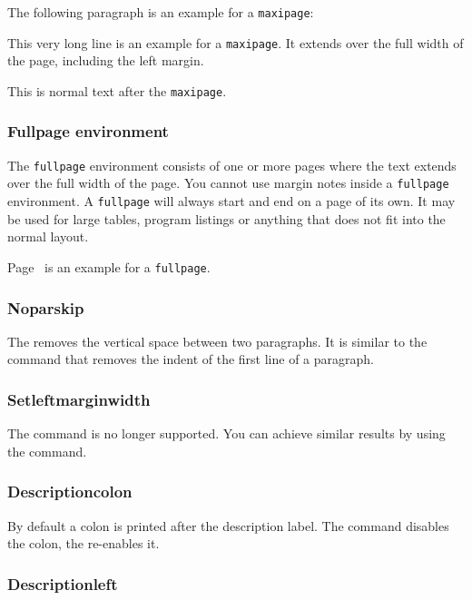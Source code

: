 The following paragraph is an example for a \texttt{maxipage}:
\nopagebreak
\begin{maxipage}
This very long line is an example for a \texttt{maxipage}. It extends 
over the full width of the page, including the left margin.
\end{maxipage}\nopagebreak
This is normal text after the \texttt{maxipage}.

\subsubsection{Fullpage environment} \label{fullpage}

The \texttt{fullpage} environment consists of one or more pages where 
the text extends over the full width of the page. You cannot use 
margin notes inside a \texttt{fullpage} environment. A \texttt{fullpage} 
will always start and end on a page of its own. It may be used for 
large tables, program listings or anything that does not fit into the 
normal layout.

Page~\pageref{bild} is an example for a \texttt{fullpage}.

\subsubsection{Noparskip}

The  removes the vertical space between two 
paragraphs. It is similar to the  command that removes 
the indent of the first line of a paragraph.

\subsubsection{Setleftmarginwidth}

The  command is no longer supported. You can 
achieve similar results by using the  command.

\subsubsection{Descriptioncolon}

By default a colon is printed after the description label.  The command
  disables the colon, the
 re-enables it.

\subsubsection{Descriptionleft}


